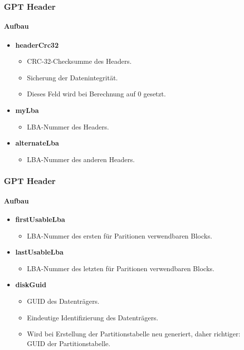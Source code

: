 \begin{frame}
    \frametitle{GPT Header}
    \framesubtitle{Aufbau}

    \begin{itemize}
        \item \textbf{headerCrc32}
        \begin{itemize}
            \item CRC-32-Checksumme des Headers.
            \item Sicherung der Datenintegrität.
            \item Dieses Feld wird bei Berechnung auf 0 gesetzt.
        \end{itemize}

        \pause
        \item \textbf{myLba}
        \begin{itemize}
            \item LBA-Nummer des Headers.
        \end{itemize}

        \pause
        \item \textbf{alternateLba}
        \begin{itemize}
            \item LBA-Nummer des anderen Headers.
        \end{itemize}
    \end{itemize}
\end{frame}

\begin{frame}
    \frametitle{GPT Header}
    \framesubtitle{Aufbau}

    \begin{itemize}
        \item \textbf{firstUsableLba}
        \begin{itemize}
            \item LBA-Nummer des ersten für Paritionen verwendbaren Blocks.
        \end{itemize}

        \pause
        \item \textbf{lastUsableLba}
        \begin{itemize}
            \item LBA-Nummer des letzten für Paritionen verwendbaren Blocks.
        \end{itemize}

        \pause
        \item \textbf{diskGuid}
        \begin{itemize}
            \item GUID des Datenträgers.
            \item Eindeutige Identifizierung des Datenträgers.
            \item Wird bei Erstellung der Partitionstabelle neu generiert, daher richtiger: 
            \\GUID der Partitionstabelle.
        \end{itemize}
    \end{itemize}
\end{frame}

